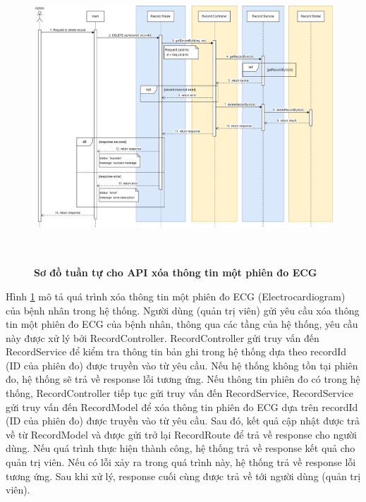  \begin{figure}[H]
  \centering
  \includegraphics[width=16cm,height=11cm]{Images/sequence_api/deleteRecordById.png}
  \caption[Sơ đồ tuần tự cho API xóa thông tin một phiên đo ECG ]{\bfseries \fontsize{12pt}{0pt}
  \selectfont Sơ đồ tuần tự cho API xóa thông tin một phiên đo ECG }
  \label{deleteRecordById} %
\end{figure}
Hình \ref{deleteRecordById} mô tả quá trình xóa thông tin một phiên đo ECG (Electrocardiogram) của bệnh nhân trong hệ thống. Người dùng (quản trị viên) gửi yêu cầu xóa thông tin một phiên đo ECG của bệnh nhân, thông qua các tầng của hệ thống, 
yêu cầu này được xử lý bởi RecordController. RecordController gửi truy vấn đến RecordService để kiểm tra thông tin bản ghi trong hệ thống dựa theo recordId (ID của phiên đo) được truyền vào từ yêu cầu. Nếu hệ thống không tồn tại phiên đo, hệ thống sẽ trả về response lỗi tương ứng. 
Nếu thông tin phiên đo có trong hệ thống, RecordController tiếp tục gửi truy vấn đến RecordService, RecordService gửi truy vấn đến RecordModel để xóa thông tin phiên đo ECG dựa trên recordId (ID của phiên đo) được truyền vào từ yêu cầu. Sau đó, kết quả cập nhật được trả về từ RecordModel 
và được gửi trở lại RecordRoute để trả về response cho người dùng. Nếu quá trình thực hiện thành công, hệ thống trả về response kết quả cho quản trị viên. Nếu có lỗi xảy ra  trong quá trình này, hệ thống trả về response lỗi tương ứng. Sau khi xử lý, response cuối cùng được trả về tới người dùng (quản trị viên).


